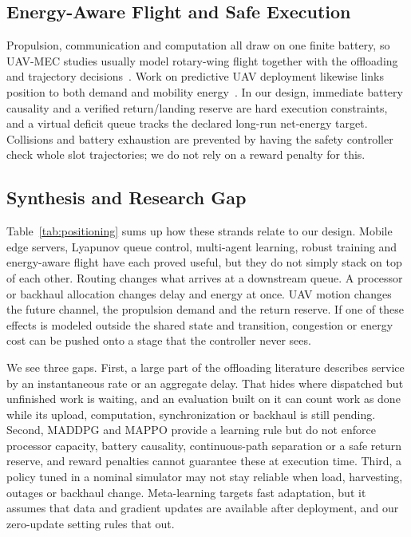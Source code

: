 \subsection{Energy-Aware Flight and Safe Execution}
Propulsion, communication and computation all draw on one finite battery, so
UAV-MEC studies usually model rotary-wing flight together with the offloading
and trajectory decisions~\cite{liu2020uav,talukdar2026mappo}. Work on
predictive UAV deployment likewise links position to both demand and
mobility energy~\cite{zhang2019predictive}. In our design, immediate battery
causality and a verified return/landing reserve are hard execution
constraints, and a virtual deficit queue tracks the declared long-run
net-energy target. Collisions and battery exhaustion are prevented by having
the safety controller check whole slot trajectories; we do not rely on a
reward penalty for this.

\subsection{Synthesis and Research Gap}
Table~\ref{tab:positioning} sums up how these strands relate to our design.
Mobile edge servers, Lyapunov queue control, multi-agent learning, robust
training and energy-aware flight have each proved useful, but they do not
simply stack on top of each other. Routing changes what arrives at a
downstream queue. A processor or backhaul allocation changes delay and energy
at once. UAV motion changes the future channel, the propulsion demand and the
return reserve. If one of these effects is modeled outside the shared state
and transition, congestion or energy cost can be pushed onto a stage that the
controller never sees.

We see three gaps. First, a large part of the offloading literature describes
service by an instantaneous rate or an aggregate delay. That hides where
dispatched but unfinished work is waiting, and an evaluation built on it can
count work as done while its upload, computation, synchronization or backhaul
is still pending. Second, MADDPG and MAPPO provide a learning rule but do not
enforce processor capacity, battery causality, continuous-path separation or
a safe return reserve, and reward penalties cannot guarantee these at
execution time. Third, a policy tuned in a nominal simulator may not stay
reliable when load, harvesting, outages or backhaul change. Meta-learning
targets fast adaptation, but it assumes that data and gradient updates are
available after deployment, and our zero-update setting rules that out.

